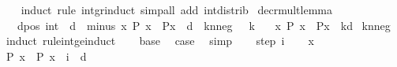 \begin{isabellebody}
%
\isadelimproof
\ \ %
\endisadelimproof
%
\isatagproof
{}\isamarkupfalse%
\ {\isacharparenleft}{\kern0pt}induct\ rule{\isacharcolon}{\kern0pt}\ int{\isacharunderscore}{\kern0pt}gr{\isacharunderscore}{\kern0pt}induct{\isacharparenright}{\kern0pt}\ {\isacharparenleft}{\kern0pt}simp{\isacharunderscore}{\kern0pt}all\ add{\isacharcolon}{\kern0pt}\ int{\isacharunderscore}{\kern0pt}distrib{\isacharparenright}{\kern0pt}%
\endisatagproof
{\isafoldproof}%
%
\isadelimproof
\isanewline
%
\endisadelimproof
\isanewline
{}\isamarkupfalse%
\ decr{\isacharunderscore}{\kern0pt}mult{\isacharunderscore}{\kern0pt}lemma{\isacharcolon}{\kern0pt}\isanewline
\ \ \ dpos{\isacharcolon}{\kern0pt}\ {\isachardoublequoteopen}{\isacharparenleft}{\kern0pt}{}{\isacharcolon}{\kern0pt}{\isacharcolon}{\kern0pt}int{\isacharparenright}{\kern0pt}\ {\isacharless}{\kern0pt}\ d{\isachardoublequoteclose}\ \ minus{\isacharcolon}{\kern0pt}\ {\isachardoublequoteopen}{\isasymforall}x{\isachardot}{\kern0pt}\ P\ x\ {\isasymlongrightarrow}\ P{\isacharparenleft}{\kern0pt}x\ {\isacharminus}{\kern0pt}\ d{\isacharparenright}{\kern0pt}{\isachardoublequoteclose}\ \ knneg{\isacharcolon}{\kern0pt}\ {\isachardoublequoteopen}{}\ {\isacharless}{\kern0pt}{\isacharequal}{\kern0pt}\ k{\isachardoublequoteclose}\isanewline
\ \ \ {\isachardoublequoteopen}{\isasymforall}x{\isachardot}{\kern0pt}\ P\ x\ {\isasymlongrightarrow}\ P{\isacharparenleft}{\kern0pt}x\ {\isacharminus}{\kern0pt}\ k{\isacharasterisk}{\kern0pt}d{\isacharparenright}{\kern0pt}{\isachardoublequoteclose}\isanewline
%
\isadelimproof
%
\endisadelimproof
%
\isatagproof
{}\isamarkupfalse%
\ knneg\isanewline
{}\isamarkupfalse%
\ {\isacharparenleft}{\kern0pt}induct\ rule{\isacharcolon}{\kern0pt}int{\isacharunderscore}{\kern0pt}ge{\isacharunderscore}{\kern0pt}induct{\isacharparenright}{\kern0pt}\isanewline
\ \ \isamarkupfalse%
\ base\ \isamarkupfalse%
\ {\isacharquery}{\kern0pt}case\ \isamarkupfalse%
\ simp\isanewline
{}\isamarkupfalse%
\isanewline
\ \ \isamarkupfalse%
\ {\isacharparenleft}{\kern0pt}step\ i{\isacharparenright}{\kern0pt}\isanewline
\ \ \isacommand{{\isacharbraceleft}{\kern0pt}}\isamarkupfalse%
\isamarkupfalse%
\ x\isanewline
\ \ \ \ \isamarkupfalse%
\ {\isachardoublequoteopen}P\ x\ {\isasymlongrightarrow}\ P\ {\isacharparenleft}{\kern0pt}x\ {\isacharminus}{\kern0pt}\ i\ {\isacharasterisk}{\kern0pt}\ d{\isacharparenright}{\kern0pt}{\isachardoublequoteclose}\ \isamarkupfalse%

\end{isabellebody}
